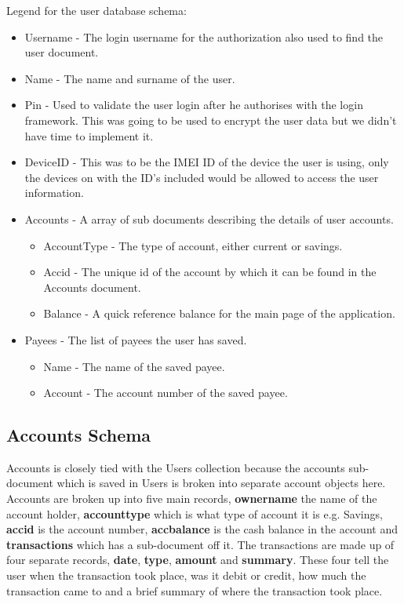 Legend for the user database schema:
\begin{itemize}
    \item Username - The login username for the authorization also used to find the user document.
    \item Name - The name and surname of the user.
    \item Pin - Used to validate the user login after he authorises with the login framework. This was going to be used to encrypt the user data but we didn't have time to implement it.
    \item DeviceID - This was to be the IMEI ID of the device the user is using, only the devices on with the ID's included would be allowed to access the user information.
    \item Accounts - A array of sub documents describing the details of user accounts.
        \begin{itemize}
             \item AccountType - The type of account, either current or savings.
             \item Accid - The unique id of the account by which it can be found in the Accounts document.
             \item Balance - A quick reference balance for the main page of the application.
        \end{itemize}
    \item Payees - The list of payees the user has saved.
        \begin{itemize}
            \item Name - The name of the saved payee.
            \item Account - The account number of the saved payee.
        \end{itemize}
\end{itemize}


 \subsection{Accounts Schema}
Accounts is closely tied with the Users collection because the accounts sub-document which is saved in Users is broken into separate account objects here. Accounts are broken up into five main records, \textbf{ownername} the name of the account holder, \textbf{accounttype} which is what type of account it is e.g. Savings, \textbf{accid} is the account number, \textbf{accbalance} is the cash balance in the account and \textbf{transactions} which has a sub-document off it. The transactions are made up of four separate records, \textbf{date}, \textbf{type}, \textbf{amount} and \textbf{summary}. These four tell the user when the transaction took place, was it debit or credit, how much the transaction came to and a brief summary of where the transaction took place.\paragraph{}

